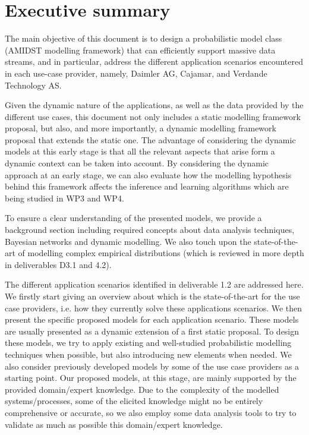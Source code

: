 \section{Executive summary}\label{section:executiveSummary}

The main objective of this document is to design a probabilistic model class (AMIDST modelling framework) that can efficiently support massive data streams, and in particular, address the different application scenarios encountered in each use-case provider, namely, Daimler AG, Cajamar, and Verdande Technology AS. 

Given the dynamic nature of the applications, as well as the data provided by the different use cases, this document not only includes a static modelling framework proposal, but also, and more importantly, a dynamic modelling framework proposal that extends the static one. The advantage of considering the dynamic models at this early stage is that all the relevant aspects that arise form a dynamic context can be taken into account. By considering the dynamic approach at an early stage, we can also evaluate how the modelling hypothesis behind this framework affects the inference and learning algorithms which are being studied in WP3 and WP4. 


To ensure a clear understanding of the presented models, we  provide a background section including required concepts about data analysis techniques, Bayesian networks and dynamic modelling. We also touch upon the state-of-the-art of modelling complex empirical distributions (which is reviewed in more depth in deliverables D3.1 and 4.2).

The different application scenarios identified in deliverable 1.2 are addressed here. We firstly start giving an overview about which is the state-of-the-art for the use case providers, i.e. how they currently solve these applications scenarios. We then present the specific proposed models for each application scenario. These models are usually presented as a dynamic extension of a first static proposal. To design these models, we try to apply existing and well-studied probabilistic modelling techniques when possible, but also introducing new elements when needed. We also consider previously developed models by some of the use case providers as a starting point. Our proposed models, at this stage, are mainly supported by the provided domain/expert knowledge. Due to the complexity of the modelled systems/processes, some of the elicited knowledge might no be entirely comprehensive or accurate, so we also employ some data analysis tools to try to validate as much as possible this domain/expert knowledge.  %

